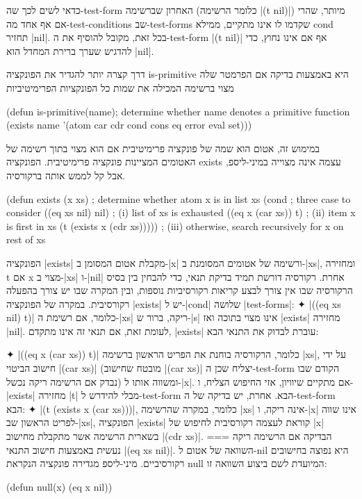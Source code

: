 כדאי לשים לכך שה-test-form האחרון שברשימה (כלומר הרשימה \T|(t nil)|) מיותר,
שהרי אם אף אחד מה-test-conditions שב-test-forms שקדמו לו אינו מתקיים, ממילא
cond תחזיר \E|nil|. בכל זאת, מקובל להוסיף את ה-test-form \T|(t nil)| אף אם אינו
נחוץ, כדי להדגיש שערך ברירת המחדל הוא \E|nil|.

דרך קצרה יותר להגדיר את הפונקציה is-primitive היא באמצעות בדיקה אם הפרמטר
שלה מצוי ברשימה המכילה את שמות כל הפונקציות הפרימיטיביות
\begin{KERNEL}
(defun is-primitive(name); determine whether name denotes a primitive function
  (exists name '(atom car cdr cond cons eq error eval set)))
\end{KERNEL}
במימוש זה, אטום הוא שמה של פונקציה פרימיטיבית אם הוא מצוי בתוך רשימה של האטומים
המציינות פונקציה פרימיטיבית. הפונקציה exists עצמה אינה מצוייה במיני-ליספ, אבל
קל לממש אותה ברקורסיה.
\begin{LISP}
(defun exists (x xs) ; determine whether atom x is in list xs
  (cond ; three case to consider
    ((eq xs nil) nil) ; (i) list of xs is exhausted
    ((eq x (car xs)) t) ; (ii) item x is first in xs
    (t (exists x (cdr xs))))) ; (iii) otherwise, search recursively for x on rest of xs
\end{LISP}
הפונקציה \T|exists| מקבלת אטום המסומן ב-\T|x| ורשימה של אטומים המסומנת
ב-\T|xs|, ומחזירה t אם x מצוי ב-\T|xs| ו-\T|nil| אחרת. רקורסיה דורשת תמיד
בדיקת תנאי, כדי להבחין בין בסיס הרקורסיה שבו אין צורך לבצע קריאות רקורסיביות
נוספות, ובין המקרה שבו יש צורך בהפעלה רקורסיבית. במקרה של הפונקציה \T|exists|
יש ל-\T|cond| שלושה \E|test-forms|:
✦ \T|((eq xs nil) t)| כלומר, אם רשימת ה-\T|xs| ריקה, ברור ש-\T|s| אינו מצוי
בתוכה ואז \T|exists| מחזירה \T|nil|. לעומת זאת, אם תנאי זה אינו מתקדם,
\T|exists| עוברת לבדוק את התנאי הבא:

✦ \T|((eq x (car xs)) t)| כלומר, הרקורסיה בוחנת את הפריט הראשון ברשימה \T|xs|,
על ידי חישוב הביטוי \T|(car xs)| (מובטח שחישוב \T|(car xs)| יצליח שכן
ה-test-form הקודם שבו נבדק אם הרשימה ריקה נכשל) ומשווה אותו ל-\T|x|. אם מתקיים
שיוויון, אזי החיפוש הצליח, ו-\T|exists| מחזירה \T|t| מבלי להידרש ל-test-form
הבא. אחרת, יש בדיקה של ה-test-form הבא:
✦ \T|(t (exists x (car xs)))|, כלומר, במקרה שהרשימה \T|xs| אינה ריקה, ו-\T|x|
אינו שווה לפריט הראשון שב-\T|xs|, הפונקציה \T|exists| קוראת לעצמה רקורסיבית לחיפוש של
\T|x| בשארית הרשימה אשר מתקבלת מחישוב \T|(cdr xs)|.
===
הבדיקה אם הרשימה ריקה נעשית באמצעות חישוב התנאי \T|(eq xs nil)|. השוואה של
אטום ל-nil היא נפוצה בחישובים רקורסיביים. מיני-ליספ מגדירה פונקציה הנקראת null
המיועדת לשם ביצוע השוואה זו:
\begin{LIBRARY}
(defun null(x) (eq x nil))
\end{LIBRARY}

